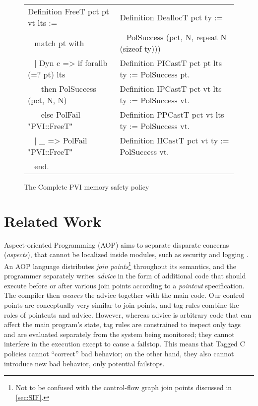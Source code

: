 \documentclass{llncs}
\begin{document}
\begin{figure}[t]
{\begin{tabular}{l l}
    Definition FreeT pct pt vt lts :=   & Definition DeallocT pct ty := \\
    ~ match pt with                     & ~ PolSuccess (pct, N, repeat N (sizeof ty))) \\
    ~ | Dyn c => if forallb (=? pt) lts & Definition PICastT pct pt lts ty := PolSuccess pt. \\
    ~ ~ then PolSuccess (pct, N, N)     & Definition IPCastT pct vt lts ty := PolSuccess vt. \\
    ~ ~ else PolFail "PVI::FreeT"     & Definition PPCastT pct vt lts ty := PolSuccess vt. \\
    ~ | \_ => PolFail "PVI::FreeT"    & Definition IICastT pct vt ty := PolSuccess vt. \\
    ~ end. \\[0.5em]
      \end{tabular} }
    
  \caption{The Complete PVI memory safety policy}
  \label{fig:fullcode}
\end{figure}

\section{Related Work}
\label{sec:related}

Aspect-oriented Programming (AOP) aims to separate disparate concerns ({\em aspects}),
that cannot be localized inside modules, such as security and logging \cite{Kiczales97:AOP}. %
An AOP language distributes {\em join points}\footnote{Not to be confused with the control-flow graph
join points discussed in \cref{sec:SIF}.} throughout its semantics, 
and the programmer separately writes {\em advice} in the form of
additional code that should execute before or after various join points according to
a {\em pointcut} specification. The compiler
then {\em weaves} the advice together with the main code. 
Our control points are conceptually very similar to join points, 
and tag rules combine the roles of pointcuts and advice.
However, whereas advice is arbitrary code that can affect the main program's state,
tag rules are constrained to inspect only tags and are evaluated separately
from the system being monitored; they cannot interfere in the execution except to cause a failstop.
This means that
Tagged C policies cannot ``correct'' bad behavior; on the other hand, they also cannot introduce
new bad behavior, only potential failstops. 
\end{document}
